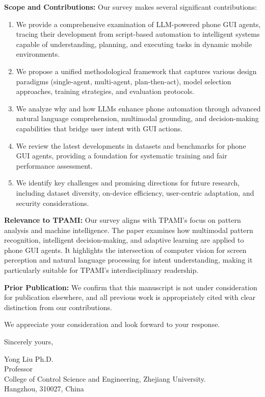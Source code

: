 \documentclass{article}
\begin{document}
\textbf{Scope and Contributions:} Our survey makes several significant contributions:

\begin{enumerate}
    \item We provide a comprehensive examination of LLM-powered phone GUI agents, tracing their development from script-based automation to intelligent systems capable of understanding, planning, and executing tasks in dynamic mobile environments.
    
    \item We propose a unified methodological framework that captures various design paradigms (single-agent, multi-agent, plan-then-act), model selection approaches, training strategies, and evaluation protocols.
    
    \item We analyze why and how LLMs enhance phone automation through advanced natural language comprehension, multimodal grounding, and decision-making capabilities that bridge user intent with GUI actions.
    
    \item We review the latest developments in datasets and benchmarks for phone GUI agents, providing a foundation for systematic training and fair performance assessment.
    
    \item We identify key challenges and promising directions for future research, including dataset diversity, on-device efficiency, user-centric adaptation, and security considerations.
\end{enumerate}

\textbf{Relevance to TPAMI:} Our survey aligns with TPAMI's focus on pattern analysis and machine intelligence. The paper examines how multimodal pattern recognition, intelligent decision-making, and adaptive learning are applied to phone GUI agents. It highlights the intersection of computer vision for screen perception and natural language processing for intent understanding, making it particularly suitable for TPAMI's interdisciplinary readership.

\textbf{Prior Publication:} We confirm that this manuscript is not under consideration for publication elsewhere, and all previous work is appropriately cited with clear distinction from our contributions.

We appreciate your consideration and look forward to your response.

\vspace{0.8em} %

Sincerely yours,

\vspace{15pt} %

Yong Liu Ph.D.\\
Professor\\
College of Control Science and Engineering, Zhejiang University.\\
Hangzhou, 310027, China
\end{document}
